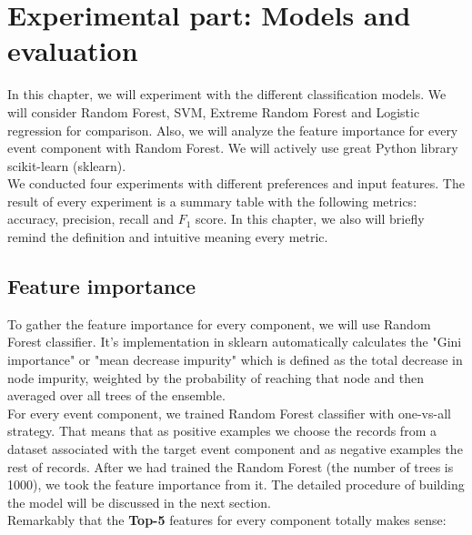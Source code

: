 \chapter{Experimental part: Models and evaluation}
\label{chap:model}
In this chapter, we will experiment with the different classification models. We will consider Random Forest, SVM, Extreme Random Forest \cite{ExtRF} and Logistic regression for comparison. Also, we will analyze the feature importance for every event component with Random Forest. We will actively use great Python library scikit-learn (sklearn).\\

We conducted four experiments with different preferences and input features. The result of every experiment is a summary table with the following metrics: accuracy, precision, recall and $F_1$ score. In this chapter, we also will briefly remind the definition and intuitive meaning every metric.\\

\section{Feature importance}
To gather the feature importance for every component, we will use Random Forest classifier. It's implementation in sklearn automatically calculates the "Gini importance" or "mean decrease impurity" which is defined as the total decrease in node impurity, weighted by the probability of reaching that node and then averaged over all trees of the ensemble.\\

For every event component, we trained Random Forest classifier with one-vs-all strategy. That means that as positive examples we choose the records from a dataset associated with the target event component and as negative examples the rest of records. After we had trained the Random Forest (the number of trees is 1000), we took the feature importance from it. The detailed procedure of building the model will be discussed in the next section.\\

Remarkably that the \textbf{Top-5} features for every component totally makes sense:

